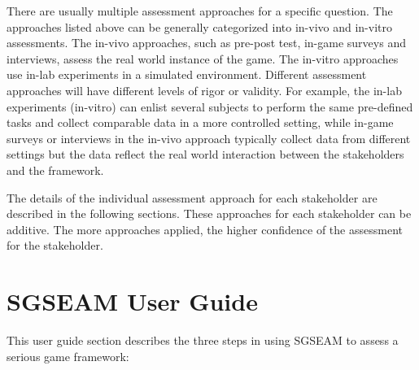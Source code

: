 \documentclass[11pt]{article}
\begin{document}
There are usually multiple assessment approaches for a specific question. The approaches listed above can be generally categorized into in-vivo and in-vitro assessments. The in-vivo approaches, such as pre-post test, in-game surveys and interviews, assess the real world instance of the game. The in-vitro approaches use in-lab experiments in a simulated environment. Different assessment
approaches will have different levels of rigor or validity. For example, the in-lab experiments (in-vitro) can enlist several subjects to perform the same pre-defined tasks and collect comparable data in a more controlled setting, while in-game surveys or interviews in the in-vivo approach typically collect data from different settings but the data reflect the real world interaction between the stakeholders and the framework.

The details of the individual assessment approach for each stakeholder are described in the following sections. These approaches for each stakeholder can be additive. The more approaches applied, the higher confidence of the assessment for the stakeholder.

\section{SGSEAM User Guide}

This user guide section describes the three steps in using SGSEAM to assess a serious game framework:
\end{document}
